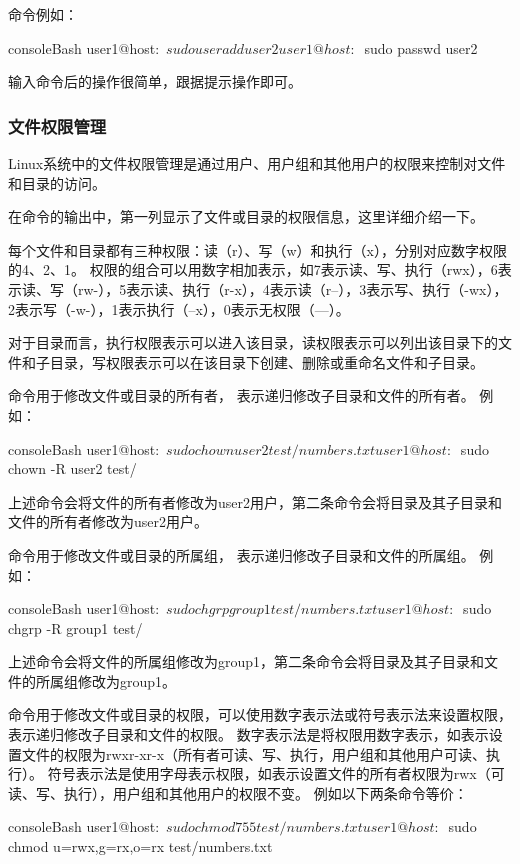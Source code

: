 命令例如：
\begin{envcode}{console}{Bash}
user1@host:~$ sudo useradd user2
user1@host:~$ sudo passwd user2
\end{envcode}

输入命令后的操作很简单，跟据提示操作即可。

\subsubsection{文件权限管理}
Linux系统中的文件权限管理是通过用户、用户组和其他用户的权限来控制对文件和目录的访问。

在命令的输出中，第一列显示了文件或目录的权限信息，这里详细介绍一下。

每个文件和目录都有三种权限：读（r）、写（w）和执行（x），分别对应数字权限的4、2、1。
权限的组合可以用数字相加表示，如7表示读、写、执行（rwx），6表示读、写（rw-），5表示读、执行（r-x），4表示读（r--），3表示写、执行（-wx），2表示写（-w-），1表示执行（--x），0表示无权限（---）。

对于目录而言，执行权限表示可以进入该目录，读权限表示可以列出该目录下的文件和子目录，写权限表示可以在该目录下创建、删除或重命名文件和子目录。

命令用于修改文件或目录的所有者， 表示递归修改子目录和文件的所有者。
例如：
\begin{envcode}{console}{Bash}
user1@host:~$ sudo chown user2 test/numbers.txt
user1@host:~$ sudo chown -R user2 test/
\end{envcode}
上述命令会将文件的所有者修改为user2用户，第二条命令会将目录及其子目录和文件的所有者修改为user2用户。

命令用于修改文件或目录的所属组， 表示递归修改子目录和文件的所属组。
例如：
\begin{envcode}{console}{Bash}
user1@host:~$ sudo chgrp group1 test/numbers.txt
user1@host:~$ sudo chgrp -R group1 test/
\end{envcode}
上述命令会将文件的所属组修改为group1，第二条命令会将目录及其子目录和文件的所属组修改为group1。

命令用于修改文件或目录的权限，可以使用数字表示法或符号表示法来设置权限，表示递归修改子目录和文件的权限。
数字表示法是将权限用数字表示，如表示设置文件的权限为rwxr-xr-x（所有者可读、写、执行，用户组和其他用户可读、执行）。
符号表示法是使用字母表示权限，如表示设置文件的所有者权限为rwx（可读、写、执行），用户组和其他用户的权限不变。
例如以下两条命令等价：
\begin{envcode}{console}{Bash}
user1@host:~$ sudo chmod 755 test/numbers.txt
user1@host:~$ sudo chmod u=rwx,g=rx,o=rx test/numbers.txt
\end{envcode}

